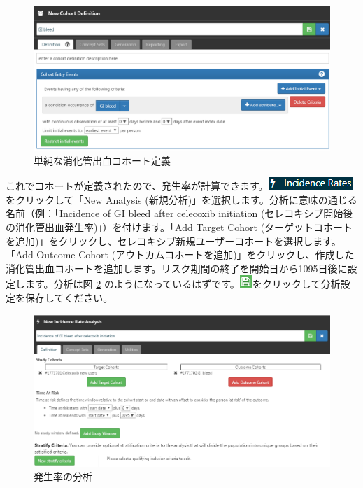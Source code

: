 \documentclass[
  11pt]{book}
\theoremstyle{definition}
\theoremstyle{definition}
\theoremstyle{definition}
\theoremstyle{definition}
\theoremstyle{remark}
\begin{document}
\begin{figure}

{\centering \includegraphics[width=1\linewidth]{images/SuggestedAnswers/giBleedCohortDefinition} 

}

\caption{単純な消化管出血コホート定義}\label{fig:giBleedCohortDefinition}
\end{figure}

これでコホートが定義されたので、発生率が計算できます。\includegraphics{images/Characterization/atlasIncidenceMenuItem.png}をクリックして「New Analysis (新規分析)」を選択します。分析に意味の通じる名前（例：「Incidence of GI bleed after celecoxib initiation (セレコキシブ開始後の消化管出血発生率)」）を付けます。「Add Target Cohort (ターゲットコホートを追加)」をクリックし、セレコキシブ新規ユーザーコホートを選択します。「Add Outcome Cohort (アウトカムコホートを追加)」をクリックし、作成した消化管出血コホートを追加します。リスク期間の終了を開始日から1095日後に設定します。分析は図 \ref{fig:irAnalysis} のようになっているはずです。\includegraphics{images/Cohorts/save.png}をクリックして分析設定を保存してください。

\begin{figure}

{\centering \includegraphics[width=1\linewidth]{images/SuggestedAnswers/irAnalysis} 

}

\caption{発生率の分析}\label{fig:irAnalysis}
\end{figure}
\end{document}
